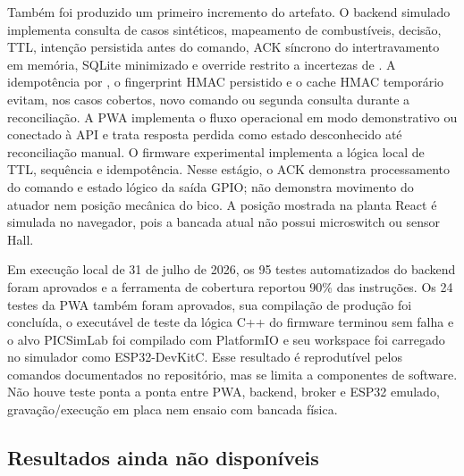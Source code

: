 Também foi produzido um primeiro incremento do artefato. O backend simulado
implementa consulta de casos sintéticos, mapeamento de combustíveis, decisão,
TTL, intenção persistida antes do comando, ACK síncrono do intertravamento em
memória, SQLite minimizado e override restrito a incertezas de
. A idempotência por , o
fingerprint HMAC persistido e o cache HMAC temporário evitam, nos casos cobertos,
novo comando ou segunda consulta durante a reconciliação. A PWA implementa o
fluxo operacional em modo demonstrativo ou conectado à API e trata resposta
perdida como estado desconhecido até reconciliação manual. O firmware
experimental implementa a lógica local de TTL, sequência e idempotência.
Nesse estágio, o ACK demonstra processamento do comando e estado lógico da
saída GPIO; não demonstra movimento do atuador nem posição mecânica do bico. A
posição mostrada na planta React é simulada no navegador, pois a bancada atual
não possui microswitch ou sensor Hall.

Em execução local de 31 de julho de 2026, os 95 testes automatizados do backend
foram aprovados e a ferramenta de cobertura reportou 90\% das instruções. Os
24 testes da PWA também foram aprovados, sua compilação de produção foi
concluída, o executável de teste da lógica C++ do firmware terminou sem falha e
o alvo PICSimLab foi compilado com PlatformIO e seu workspace foi carregado no
simulador como ESP32-DevKitC.
Esse resultado é reprodutível pelos comandos documentados no repositório, mas
se limita a componentes de software. Não houve teste ponta a ponta entre PWA,
backend, broker e ESP32 emulado, gravação/execução em placa nem ensaio com bancada física.

\subsection{Resultados ainda não disponíveis}

